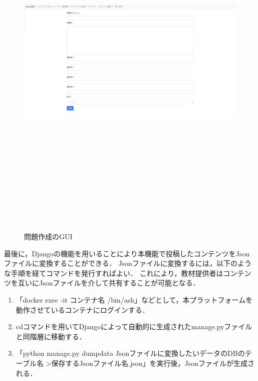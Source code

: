 \begin{figure}[htbp]
    \begin{center}
        \includegraphics[width=18cm,height=17cm,keepaspectratio]{create_question-crop.pdf}\\
    \end{center}
    \caption{問題作成のGUI}
    \label{create_question}
\end{figure}

最後に，Djangoの機能を用いることにより本機能で投稿したコンテンツをJsonファイルに変換することができる．
Jsonファイルに変換するには，以下のような手順を経てコマンドを発行すればよい．
これにより，教材提供者はコンテンツを互いにJsonファイルを介して共有することが可能となる．

\begin{enumerate}
    \item 「docker exec -it コンテナ名 /bin/ash」などとして，本プラットフォームを動作させているコンテナにログインする．
    \item cdコマンドを用いてDjangoによって自動的に生成されたmanage.pyファイルと同階層に移動する．
    \item 「python manage.py dumpdata Jsonファイルに変換したいデータのDBのテーブル名 \textgreater 保存するJsonファイル名.json」を実行後，Jsonファイルが生成される．
\end{enumerate}